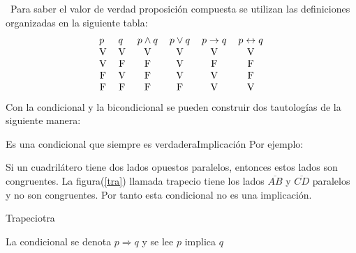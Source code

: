 \nota\ Para saber el valor de verdad  proposición compuesta se utilizan las definiciones
 organizadas en la siguiente tabla:
\[%
\begin{tabular}
[c]{llllll}%
$ p$ &$q$ & $p\wedge q$ & $p\vee q$ & $p\rightarrow q$ &
$p\leftrightarrow q$\\
\multicolumn{1}{c}{V}&\multicolumn{1}{c}{V} & \multicolumn{1}{c}{V} & \multicolumn{1}{c}{V} &
\multicolumn{1}{c}{V} & \multicolumn{1}{c}{V}\\
\multicolumn{1}{c}{V}&\multicolumn{1}{c}{F} & \multicolumn{1}{c}{F} & \multicolumn{1}{c}{V} &
\multicolumn{1}{c}{F} & \multicolumn{1}{c}{F}\\
\multicolumn{1}{c}{F}&\multicolumn{1}{c}{V} & \multicolumn{1}{c}{F} & \multicolumn{1}{c}{V} &
\multicolumn{1}{c}{V} & \multicolumn{1}{c}{F}\\
\multicolumn{1}{c}{F}&\multicolumn{1}{c}{F} & \multicolumn{1}{c}{F} & \multicolumn{1}{c}{F} &
\multicolumn{1}{c}{V} & \multicolumn{1}{c}{V}%
\end{tabular}
\]
Con la condicional y la bicondicional se pueden construir dos tautologías de la
siguiente
manera:
\begin{ideas}{Es una condicional que siempre es verdadera}{Implicaci\'on}
 Por ejemplo:
\end{ideas}
\begin{ejemplo}{ Si un cuadril\'atero tiene dos lados opuestos paralelos,
entonces estos lados son congruentes.}
La figura(\ref{tra}) llamada trapecio tiene los lados $\overline{AB}$ y
$\overline{CD}$ paralelos y no son congruentes. Por tanto esta condicional no es
una implicaci\'on.
\begin{figura}{
}{Trapecio}{tra}
\end{figura}
La condicional se denota $p \Longrightarrow q$ y se lee $p$ implica $q$
\end{ejemplo}
